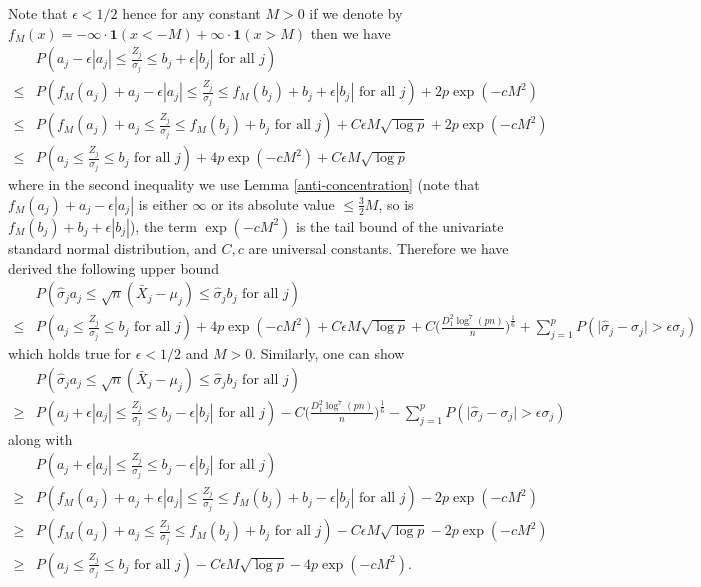 \documentclass[mnsc,blindrev]{informs4} %
\newcommand{\abs}[1]{\left \vert #1 \right\vert}
\begin{document}
Note that $\epsilon<1/2$ hence for any constant $M>0$ if we denote by $f_M(x)=-\infty\cdot \mathbf{1}(x<-M)+\infty\cdot \mathbf{1}(x>M)$ then we have
\begin{align*}
&P(a_j-\epsilon \abs{a_j}\leq \frac{Z_j}{\sigma_j}\leq b_j+\epsilon \abs{b_j}\text{ for all }j)\\
\leq &P(f_M(a_j)+a_j-\epsilon \abs{a_j}\leq \frac{Z_j}{\sigma_j}\leq f_M(b_j)+b_j+\epsilon \abs{b_j}\text{ for all }j)+2p\exp(-cM^2)\\
\leq &P(f_M(a_j)+a_j\leq \frac{Z_j}{\sigma_j}\leq f_M(b_j)+b_j\text{ for all }j)+C\epsilon M\sqrt{\log p}+2p\exp(-cM^2)\\
\leq &P(a_j\leq \frac{Z_j}{\sigma_j}\leq b_j\text{ for all }j)+4p\exp(-cM^2)+C\epsilon M\sqrt{\log p}
\end{align*}
where in the second inequality we use Lemma \ref{anti-concentration} (note that $f_M(a_j)+a_j-\epsilon \abs{a_j}$ is either $\infty$ or its absolute value $\leq \frac{3}{2}M$, so is $f_M(b_j)+b_j+\epsilon \abs{b_j}$), the term $\exp(-cM^2)$ is the tail bound of the univariate standard normal distribution, and $C,c$ are universal constants. Therefore we have derived the following upper bound
\begin{align*}
&P(\hat\sigma_ja_j\leq \sqrt n(\bar{X}_j-\mu_j)\leq\hat\sigma_j b_j\text{ for all }j)\\
\leq&P(a_j\leq \frac{Z_j}{\sigma_j}\leq b_j\text{ for all }j)+4p\exp(-cM^2)+C\epsilon M\sqrt{\log p}+C\Big(\frac{D_1^2\log^7(pn)}{n}\Big)^{\frac{1}{6}}+\sum_{j=1}^pP(\big\lvert\hat\sigma_j-\sigma_j\big\rvert> \epsilon\sigma_j)
\end{align*}
which holds true for $\epsilon<1/2$ and $M>0$. Similarly, one can show
\begin{align*}
&P(\hat\sigma_ja_j\leq \sqrt n(\bar{X}_j-\mu_j)\leq\hat\sigma_j b_j\text{ for all }j)\\
\geq &P(a_j+\epsilon \abs{a_j}\leq \frac{Z_j}{\sigma_j}\leq b_j-\epsilon \abs{b_j}\text{ for all }j)-C\Big(\frac{D_1^2\log^7(pn)}{n}\Big)^{\frac{1}{6}}-\sum_{j=1}^pP(\big\lvert\hat\sigma_j-\sigma_j\big\rvert> \epsilon\sigma_j)
\end{align*}
along with
\begin{align*}
&P(a_j+\epsilon \abs{a_j}\leq \frac{Z_j}{\sigma_j}\leq b_j-\epsilon \abs{b_j}\text{ for all }j)\\
\geq &P(f_M(a_j)+a_j+\epsilon \abs{a_j}\leq \frac{Z_j}{\sigma_j}\leq f_M(b_j)+b_j-\epsilon \abs{b_j}\text{ for all }j)-2p\exp(-cM^2)\\
\geq &P(f_M(a_j)+a_j\leq \frac{Z_j}{\sigma_j}\leq f_M(b_j)+b_j\text{ for all }j)-C\epsilon M\sqrt{\log p}-2p\exp(-cM^2)\\
\geq &P(a_j\leq \frac{Z_j}{\sigma_j}\leq b_j\text{ for all }j)-C\epsilon M\sqrt{\log p}-4p\exp(-cM^2).
\end{align*}
\end{document}
